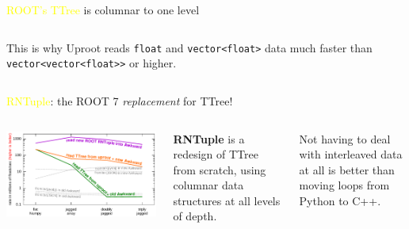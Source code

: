 \documentclass[aspectratio=169]{beamer}
\begin{document}
\begin{frame}[fragile]{\textcolor{yellow}{ROOT's TTree} is columnar to one level}
\begin{uncoverenv}
\begin{columns}
This is why Uproot reads \texttt{float} and \texttt{vector<float>} data much faster than \texttt{vector<vector<float>>} or higher.

\vspace{0.2 cm}

\vspace{0.2 cm}
\end{columns}
\end{uncoverenv}
\end{frame}

\begin{frame}{\textcolor{yellow}{RNTuple}: the ROOT 7 {\it replacement} for TTree!}
\vspace{0.75 cm}

\begin{columns}
\includegraphics[width=\linewidth]{img/read_ttree.pdf}

{\bf RNTuple} is a redesign of TTree from scratch, using columnar data structures at all levels of depth.

\vspace{0.5 cm}
Not having to deal with interleaved data at all is better than moving loops from Python to C++.
\end{columns}
\end{frame}
\end{document}
